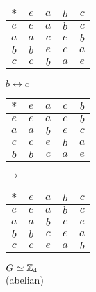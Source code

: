 \documentclass[letterpaper,12pt,fleqn]{article}
\begin{document}
\begin{minipage}{1.5in}
\begin{tabular}{c|cccc}
  $*$ & $e$ & $a$ & $b$ & $c$ \\
  \hline
  $e$ & $e$ & $a$ & $b$ & $c$ \\
  $a$ & $a$ & $c$ & $e$ & $b$ \\
  $b$ & $b$ & $e$ & $c$ & $a$ \\
  $c$ & $c$ & $b$ & $a$ & $e$ \\
\end{tabular}
\end{minipage}
\begin{minipage}{0.5in}
  $b\leftrightarrow c$
\end{minipage}
\begin{minipage}{1.5in}
\begin{tabular}{c|cccc}
  $*$ & $e$ & $a$ & $c$ & $b$ \\
  \hline
  $e$ & $e$ & $a$ & $c$ & $b$ \\
  $a$ & $a$ & $b$ & $e$ & $c$ \\
  $c$ & $c$ & $e$ & $b$ & $a$ \\
  $b$ & $b$ & $c$ & $a$ & $e$ \\
\end{tabular}
\end{minipage}
\begin{minipage}{0.5in}
  $\to$
\end{minipage}
\begin{minipage}{1.5in}
\begin{tabular}{c|cccc}
  $*$ & $e$ & $a$ & $b$ & $c$ \\
  \hline
  $e$ & $e$ & $a$ & $b$ & $c$ \\
  $a$ & $a$ & $b$ & $c$ & $e$ \\
  $b$ & $b$ & $c$ & $e$ & $a$ \\
  $c$ & $c$ & $e$ & $a$ & $b$ \\
\end{tabular}
\end{minipage}

\bigskip

$G\simeq\mathbb{Z}_4$ \\
(abelian)

\bigskip
\end{document}

